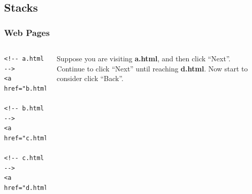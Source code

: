 \documentclass[aspectratio=169, 14pt]{beamer}
\begin{document}
{
    \begin{frame}
        \section{\textcolor{darkmidnightblue}{Stacks}}
    \end{frame}
}

\begin{frame}[fragile]
    \frametitle{Web Pages}

    \begin{columns}
        \begin{verbatim}
<!-- a.html -->
<a href="b.html">Next</a>

<!-- b.html -->
<a href="c.html">Next</a>

<!-- c.html -->
<a href="d.html">Next</a>
        \end{verbatim}
        Suppose you are visiting \textbf{a.html}, and then click ``Next''. Continue to click ``Next'' until reaching \textbf{d.html}. Now start to consider click ``Back''.
    \end{columns}

\end{frame}
\end{document}
